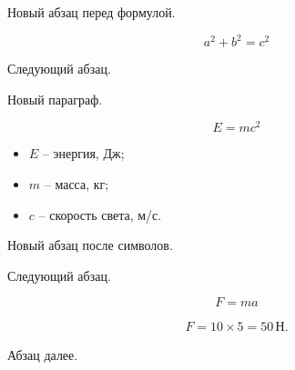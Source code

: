 \documentclass[14pt]{extarticle}
\newenvironment{eqblock}{%
  \par\vspace*{14pt}\noindent  %
}{%
  \vspace*{14pt}\par          %
}
\newenvironment{symblock}{%
  \par\noindent  %
}{%
  \vspace*{14pt}\par  %
}
\newenvironment{calcblock}{%
  \par\noindent  %
}{%
  \vspace*{14pt}\par  %
}
\begin{document}
Новый абзац перед формулой.  

\begin{eqblock}
  \begin{equation}
    a^2 + b^2 = c^2
  \end{equation}
\end{eqblock}

Следующий абзац.  %


Новый параграф.  

\begin{eqblock}
  \begin{equation}
    E = mc^2
  \end{equation}
\end{eqblock}

\begin{symblock}
  \begin{itemize}[nosep, leftmargin=0pt, labelindent=0pt,
                   topsep=0pt, partopsep=0pt, itemsep=0pt, parsep=0pt]
    \item[] $E$ – энергия, Дж;
    \item[] $m$ – масса, кг;
    \item[] $c$ – скорость света, м/с.
  \end{itemize}
\end{symblock}

Новый абзац после символов.  %


Следующий абзац.  

\begin{eqblock}
  \begin{equation}
    F = ma
  \end{equation}
\end{eqblock}

\begin{calcblock}
  \begin{multline*}
    F = 10 \times 5 
      = 50\,\text{Н}.
  \end{multline*}
\end{calcblock}

Абзац далее.  %
\end{document}
